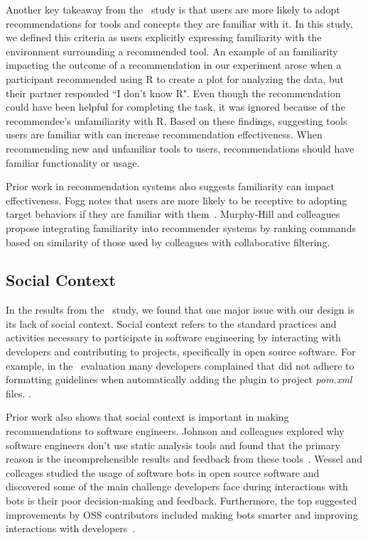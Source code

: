 Another key takeaway from the \peer~study is that users are more likely to adopt recommendations for tools and concepts they are familiar with it. In this study, we defined this criteria as users explicitly expressing familiarity with the environment surrounding a recommended tool. An example of an familiarity impacting the outcome of a recommendation in our experiment arose when a participant recommended using R to create a plot for analyzing the data, but their partner responded ``I don’t know R". Even though the recommendation could have been helpful for completing the task, it was ignored because of the recommendee's unfamiliarity with R. Based on these findings, suggesting tools users are familiar with can increase recommendation effectiveness. When recommending new and unfamiliar tools to users, recommendations should have familiar functionality or usage.

Prior work in recommendation systems also suggests familiarity can impact effectiveness. Fogg notes that users are more likely to be receptive to adopting target behaviors if they are familiar with them~\cite{Fogg2009Persuasive}. Murphy-Hill and colleagues propose integrating familiarity into recommender systems by ranking commands based on similarity of those used by colleagues with collaborative filtering.

\subsection{Social Context}

In the results from the \sorry~study, we found that one major issue with our \tele design is its lack of social context. Social context refers to the standard practices and activities necessary to participate in software engineering by interacting with developers and contributing to projects, specifically in open source software. For example, in the \sorry~evaluation many developers complained that \tool did not adhere to formatting guidelines when automatically adding the \EP plugin to project \textit{pom.xml} files. .

Prior work also shows that social context is important in making recommendations to software engineers. Johnson and colleagues explored why software engineers don't use static analysis tools and found that the primary reason is the incomprehensible results and feedback from these tools~\cite{Johnson2013Why}. Wessel and colleages studied the usage of software bots in open source software and discovered some of the main challenge developers face during interactions with bots is their poor decision-making and feedback. Furthermore, the top suggested improvements by OSS contributors included making bots smarter and improving interactions with developers~\cite{wessel2018power}.

